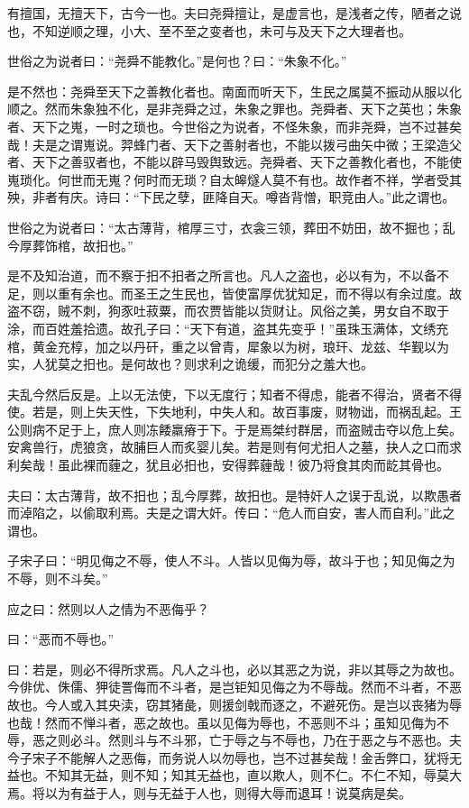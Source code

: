 \documentclass[]{article}
\begin{document}
有擅国，无擅天下，古今一也。夫曰尧舜擅让，是虚言也，是浅者之传，陋者之说也，不知逆顺之理，小大、至不至之变者也，未可与及天下之大理者也。

世俗之为说者曰：``尧舜不能教化。''是何也？曰：``朱象不化。''

是不然也：尧舜至天下之善教化者也。南面而听天下，生民之属莫不振动从服以化顺之。然而朱象独不化，是非尧舜之过，朱象之罪也。尧舜者、天下之英也；朱象者、天下之嵬，一时之琐也。今世俗之为说者，不怪朱象，而非尧舜，岂不过甚矣哉！夫是之谓嵬说。羿蜂门者、天下之善射者也，不能以拨弓曲矢中微；王梁造父者、天下之善驭者也，不能以辟马毁舆致远。尧舜者、天下之善教化者也，不能使嵬琐化。何世而无嵬？何时而无琐？自太皞燧人莫不有也。故作者不祥，学者受其殃，非者有庆。诗曰：``下民之孽，匪降自天。噂沓背憎，职竞由人。''此之谓也。

世俗之为说者曰：``太古薄背，棺厚三寸，衣衾三领，葬田不妨田，故不掘也；乱今厚葬饰棺，故抇也。''

是不及知治道，而不察于抇不抇者之所言也。凡人之盗也，必以有为，不以备不足，则以重有余也。而圣王之生民也，皆使富厚优犹知足，而不得以有余过度。故盗不窃，贼不刺，狗豕吐菽粟，而农贾皆能以货财让。风俗之美，男女自不取于涂，而百姓羞拾遗。故孔子曰：``天下有道，盗其先变乎！''虽珠玉满体，文绣充棺，黄金充椁，加之以丹矸，重之以曾青，犀象以为树，琅玕、龙兹、华觐以为实，人犹莫之抇也。是何故也？则求利之诡缓，而犯分之羞大也。

夫乱今然后反是。上以无法使，下以无度行；知者不得虑，能者不得治，贤者不得使。若是，则上失天性，下失地利，中失人和。故百事废，财物诎，而祸乱起。王公则病不足于上，庶人则冻餧羸瘠于下。于是焉桀纣群居，而盗贼击夺以危上矣。安禽兽行，虎狼贪，故脯巨人而炙婴儿矣。若是则有何尤抇人之墓，抉人之口而求利矣哉！虽此裸而薶之，犹且必抇也，安得葬薶哉！彼乃将食其肉而龁其骨也。

夫曰：太古薄背，故不抇也；乱今厚葬，故抇也。是特奸人之误于乱说，以欺愚者而淖陷之，以偷取利焉。夫是之谓大奸。传曰：``危人而自安，害人而自利。''此之谓也。

子宋子曰：``明见侮之不辱，使人不斗。人皆以见侮为辱，故斗于也；知见侮之为不辱，则不斗矣。''

应之曰：然则以人之情为不恶侮乎？

曰：``恶而不辱也。''

曰：若是，则必不得所求焉。凡人之斗也，必以其恶之为说，非以其辱之为故也。今俳优、侏儒、狎徒詈侮而不斗者，是岂钜知见侮之为不辱哉。然而不斗者，不恶故也。今人或入其央渎，窃其猪彘，则援剑戟而逐之，不避死伤。是岂以丧猪为辱也哉！然而不惮斗者，恶之故也。虽以见侮为辱也，不恶则不斗；虽知见侮为不辱，恶之则必斗。然则斗与不斗邪，亡于辱之与不辱也，乃在于恶之与不恶也。夫今子宋子不能解人之恶侮，而务说人以勿辱也，岂不过甚矣哉！金舌弊口，犹将无益也。不知其无益，则不知；知其无益也，直以欺人，则不仁。不仁不知，辱莫大焉。将以为有益于人，则与无益于人也，则得大辱而退耳！说莫病是矣。
\end{document}
